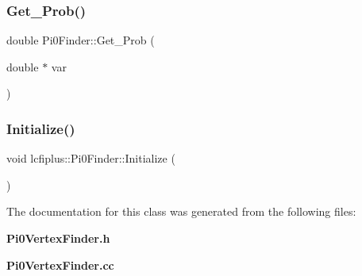 \mbox{\label{classlcfiplus_1_1Pi0Finder_a70c8b34441574a997e7f1a1c6f47e8ee}} 
\subsubsection{Get\+\_\+\+Prob()}
{\footnotesize\ttfamily double Pi0\+Finder\+::\+Get\+\_\+\+Prob (\begin{DoxyParamCaption}\item[{double $\ast$}]{var }\end{DoxyParamCaption})}

\mbox{\label{classlcfiplus_1_1Pi0Finder_aa7a9474454611537d0df068b7cf0c1c9}} 
\subsubsection{Initialize()}
{\footnotesize\ttfamily void lcfiplus\+::\+Pi0\+Finder\+::\+Initialize (\begin{DoxyParamCaption}{ }\end{DoxyParamCaption})\hspace{0.3cm}{\ttfamily [inline]}}



The documentation for this class was generated from the following files\+:\begin{DoxyCompactItemize}
\item 
\textbf{ Pi0\+Vertex\+Finder.\+h}\item 
\textbf{ Pi0\+Vertex\+Finder.\+cc}\end{DoxyCompactItemize}
